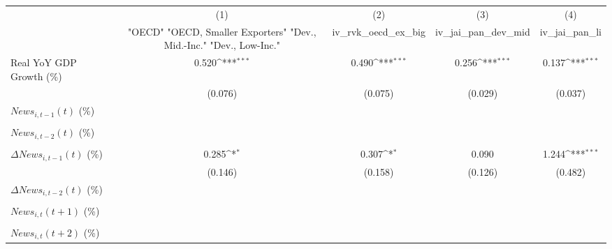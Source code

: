 {
\def\sym#1{\ifmmode^{#1}\else\(^{#1}\)\fi}
\begin{tabular}{l*{4}{c}}
\toprule
                    &\multicolumn{1}{c}{(1)}&\multicolumn{1}{c}{(2)}&\multicolumn{1}{c}{(3)}&\multicolumn{1}{c}{(4)}\\
                    &\multicolumn{1}{c}{ "OECD" "OECD, Smaller Exporters" "Dev., Mid.-Inc." "Dev., Low-Inc."}&\multicolumn{1}{c}{iv_rvk_oecd_ex_big}&\multicolumn{1}{c}{iv_jai_pan_dev_mid}&\multicolumn{1}{c}{iv_jai_pan_li}\\
\midrule
Real YoY GDP Growth (\%)&       0.520\sym{***}&       0.490\sym{***}&       0.256\sym{***}&       0.137\sym{***}\\
                    &     (0.076)         &     (0.075)         &     (0.029)         &     (0.037)         \\
\addlinespace
$ News_{i,t-1}(t)$ (\%)&                     &                     &                     &                     \\
                    &                     &                     &                     &                     \\
\addlinespace
$ News_{i,t-2}(t)$ (\%)&                     &                     &                     &                     \\
                    &                     &                     &                     &                     \\
\addlinespace
$ \Delta News_{i,t-1}(t)$ (\%)&       0.285\sym{*}  &       0.307\sym{*}  &       0.090         &       1.244\sym{***}\\
                    &     (0.146)         &     (0.158)         &     (0.126)         &     (0.482)         \\
\addlinespace
$ \Delta News_{i,t-2}(t)$ (\%)&                     &                     &                     &                     \\
                    &                     &                     &                     &                     \\
\addlinespace
$ News_{i,t}(t+1)$ (\%)&                     &                     &                     &                     \\
                    &                     &                     &                     &                     \\
\addlinespace
$ News_{i,t}(t+2)$ (\%)&                     &                     &                     &                     \\

\end{tabular}}
